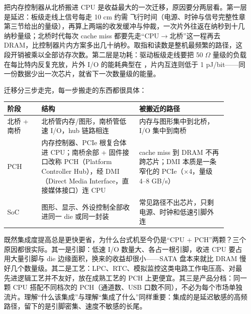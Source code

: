 把内存控制器从北桥搬进 CPU 是收益最大的一次迁移，原因要分两层看。第一层是延迟：板级走线上信号每走 10 cm 约需  飞行时间（电源、时钟与信号完整性章第三节给出的量级），再算上两端的收发缓冲与仲裁，一次片外往返在纳秒到十几纳秒量级；北桥时代每次 cache miss 都要先走“CPU$\to$北桥”这一程再去 DRAM，比控制器片内方案多出几十纳秒。取指和读数是整机最频繁的路径，这段开销被乘以全部访存次数。第二层是功耗：驱动板级走线要把 50 $\Omega$ 量级的负载在每比特内反复充放，片外 I/O 的能耗典型在 ，片内互连则低于 1 pJ/bit——同一份数据少出一次芯片，就省下一次数量级的能量。

迁移分三步走完，每一步搬走的东西都很具体：

\begin{longtable}{L{0.14\linewidth}L{0.40\linewidth}L{0.36\linewidth}}
\toprule
阶段 & 结构 & 被搬近的路径 \\
\midrule
北桥 + 南桥 & 北桥管内存/图形，南桥管低速 I/O，hub 链路相连 & 内存与图形集中到北桥，I/O 集中到南桥 \\\tablerowrule
PCH & 内存控制器、PCIe 根复合体进 CPU；南桥余部 + 固件接口改称 PCH（Platform Controller Hub），经 DMI（Direct Media Interface，直接媒体接口）连 CPU & cache miss 到 DRAM 不再跨芯片；DMI 本质是一条窄化的 PCIe（$\times$4，量级 4--8 GB/s） \\\tablerowrule
SoC & 图形、显示、外设控制全部收进同一 die 或同一封装 & 常见路径不出芯片，只剩电源、时钟和低速引脚外连 \\
\bottomrule
\end{longtable}

既然集成度提高总是更快更省，为什么台式机至今仍是“CPU + PCH”两颗？三个原因都很实际。其一是引脚：低速 I/O 数量大、各占一根引脚，收进 CPU 要占用大量引脚与 die 边缘面积，换来的收益却很小——SATA 盘本来就比 DRAM 慢好几个数量级。其二是工艺：LPC、RTC、模拟监控这类电路工作电压高、对最先进逻辑工艺并不友好，放在成熟工艺的 PCH 上更便宜。其三是产品分档：同一颗 CPU 搭配不同档次的 PCH（通道数、USB 口数不同），不必为每个市场单独流片。理解“什么该集成”与理解“集成了什么”同样重要：集成的是延迟敏感的高频路径，留下的是引脚密集、速度不敏感的长尾。

